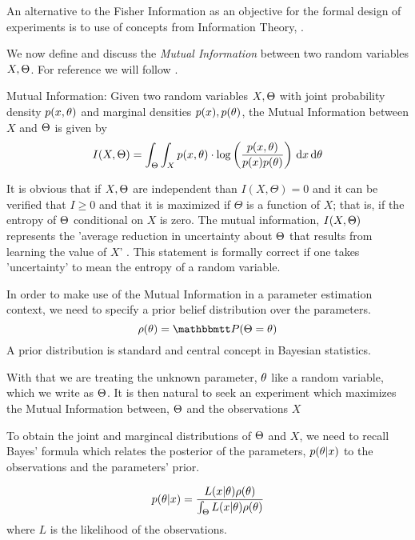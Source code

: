 An alternative to the Fisher Information as an
objective for the formal design of experiments is to use of concepts from
Information Theory,  \cite{MacKay2003}. 

We now define and discuss the {\sl Mutual Information} between
two random variables $X, {\Theta}$. For reference we will follow
\cite{MacKay2003}. 

\begin{defn}Mutual Information:
Given two random variables $X,{\Theta}$ with joint probability density
$p(x,{ \theta})$ and marginal densities $p(x), p({ \theta})$, the Mutual Information between
$X$ and ${\Theta}$ is given by
\begin{equation}
I(X,\Theta) = \int_\Theta \int_X p(x,{ \theta}) \cdot \log \left(
\frac{p(x,{ \theta})}{p(x)p({ \theta})}\right) \, \mathrm{d} x \, \mathrm{d} { \theta}
\label{eq:mutual_info_defn}
\end{equation}
\end{defn}

It is obvious that if $X,{\Theta}$ are independent than $I(X,\Theta) = 0$ and it can
be verified that $I\geq0$ and that it is maximized if $\Theta$ is a function of
$X$; that is, if the entropy of ${\Theta}$ conditional on $X$ is zero. 
The mutual information, $I(X,{\Theta})$ represents the 'average
reduction in uncertainty about ${\Theta}$ that results from learning the value of
$X$' \cite{MacKay2003}. This statement is formally correct if one takes
 'uncertainty' to mean the entropy of a random
 variable.
 
In order to make use of the Mutual Information in a parameter estimation
context, we need to specify a prior belief distribution over the  parameters.  
$$
\rho(\th) = \Prob(\Theta = \th)
$$
A prior distribution is standard and central concept in Bayesian statistics.
 
With that we are treating the unknown parameter, ${ \theta}$ like a random variable,
which we write as ${\Theta}$. It is then natural to seek an experiment which
maximizes the Mutual Information between, ${\Theta}$ and the observations $X$

To obtain the joint and margincal distributions of ${\Theta}$ and $X$, we
need to recall Bayes' formula which relates the posterior of the parameters,
$p({ \theta}|x)$ to the observations and the parameters' prior. 

\begin{equation}
p({ \theta}|x) = \frac{L(x|{ \theta})\rho({ \theta})}{\int_{\Theta} L(x|{ \theta})\rho({ \theta})}
\label{eq:bayes_formula}
\end{equation}
where $L$ is the likelihood of the observations.

